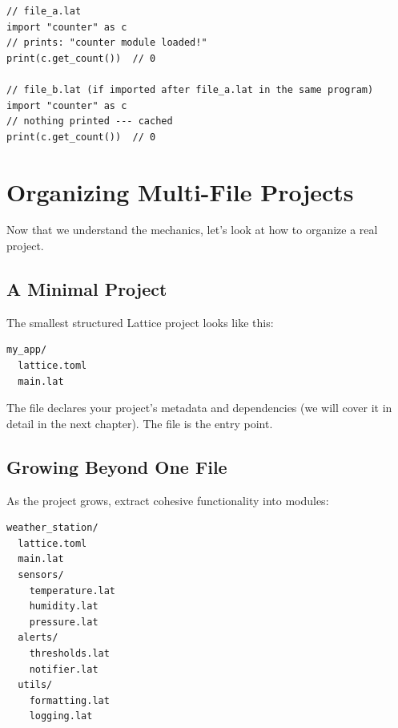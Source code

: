 \begin{lstlisting}[language=Lattice, caption={Two files importing the same module}]
// file_a.lat
import "counter" as c
// prints: "counter module loaded!"
print(c.get_count())  // 0

// file_b.lat (if imported after file_a.lat in the same program)
import "counter" as c
// nothing printed --- cached
print(c.get_count())  // 0
\end{lstlisting}

\section{Organizing Multi-File Projects}\label{sec:multi-file-projects}

Now that we understand the mechanics, let's look at how to organize a real project.

\subsection{A Minimal Project}\label{subsec:minimal-project}

The smallest structured Lattice project looks like this:

\begin{lstlisting}[language=bash, numbers=none]
my_app/
  lattice.toml
  main.lat
\end{lstlisting}

The  file declares your project's metadata and dependencies (we will cover it in detail in the next chapter).
The  file is the entry point.

\subsection{Growing Beyond One File}\label{subsec:growing-beyond}

As the project grows, extract cohesive functionality into modules:

\begin{lstlisting}[language=bash, numbers=none]
weather_station/
  lattice.toml
  main.lat
  sensors/
    temperature.lat
    humidity.lat
    pressure.lat
  alerts/
    thresholds.lat
    notifier.lat
  utils/
    formatting.lat
    logging.lat
\end{lstlisting}

